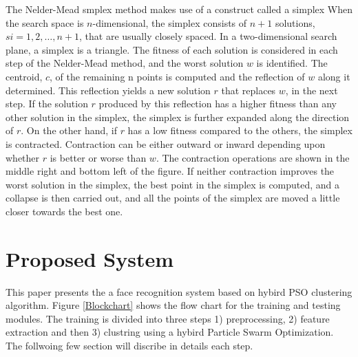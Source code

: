 \documentclass[a4paper,twoside]{article}
\begin{document}
The Nelder-Mead smplex method makes use of a construct called a simplex When the search space is $n$-dimensional, the simplex consists of $n+1$ solutions, $s i = {1,2,\dots  , n+1}$, that are usually closely spaced. In a two-dimensional search plane, a simplex is a triangle. The fitness of each solution is considered in each step of the Nelder-Mead method, and the worst solution $w$ is identified. The centroid, $c$, of the remaining n points is computed and the reflection of $w$ along it determined. This reflection yields a new solution $r$ that replaces $w$, in the next step. If the solution $r$ produced by this reflection has a higher fitness than any other solution in the simplex, the simplex is further expanded along the direction of $r$. On the other hand, if $r$ has a low fitness compared to the others, the simplex is contracted. Contraction can be either outward or inward depending upon whether $r$ is better or worse than $w$. The contraction operations are shown in the middle right and bottom left of the figure. If neither contraction improves the worst solution in the simplex, the best point in the simplex is computed, and a collapse is then carried out, and all the points of the simplex are moved a little closer towards the best one.

\section{Proposed System}
\label{sec:proposed}

This paper presents the a face recognition system based on hybird PSO clustering algorithm. Figure \ref{Blockchart} shows the flow chart for the training and testing modules. The training is divided into three steps 1) preprocessing, 2) feature extraction and then 3) clustring using a hybird Particle Swarm Optimization. The follwoing few section will discribe in details each step.  
  
\end{document}
